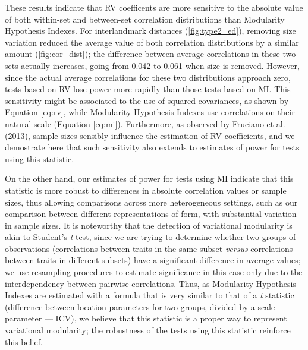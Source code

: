 \documentclass[12pt,]{article}
\begin{document}
These results indicate that RV coefficents are more sensitive to the
absolute value of both within-set and between-set correlation
distributions than Modularity Hypothesis Indexes. For interlandmark
distances (\autoref{fig:type2_ed}), removing size variation reduced the
average value of both correlation distributions by a similar amount
(\autoref{fig:cor_dist}); the difference between average correlations in
these two sets actually increases, going from 0.042 to 0.061 when size
is removed. However, since the actual average correlations for these two
distributions approach zero, tests based on RV lose power more rapidly
than those tests based on MI. This sensitivity might be associated to
the use of squared covariances, as shown by Equation \ref{eq:rv}, while
Modularity Hypothesis Indexes use correlations on their natural scale
(Equation \ref{eq:mi}). Furthermore, as observed by Fruciano et al.
(2013), sample sizes sensibly influence the estimation of RV
coefficients, and we demostrate here that such sensitivity also extends
to estimates of power for tests using this statistic.

On the other hand, our estimates of power for tests using MI indicate
that this statistic is more robust to differences in absolute
correlation values or sample sizes, thus allowing comparisons across
more heterogeneous settings, such as our comparison between different
representations of form, with substantial variation in sample sizes. It
is noteworthy that the detection of variational modularity is akin to
Student's \emph{t} test, since we are trying to determine whether two
groups of observations (correlations between traits in the same subset
\emph{versus} correlations between traits in different subsets) have a
significant difference in average values; we use resampling procedures
to estimate significance in this case only due to the interdependency
between pairwise correlations. Thus, as Modularity Hypothesis Indexes
are estimated with a formula that is very similar to that of a \emph{t}
statistic (difference between location parameters for two groups,
divided by a scale parameter --- ICV), we believe that this statistic is
a proper way to represent variational modularity; the robustness of the
tests using this statistic reinforce this belief.
\end{document}
